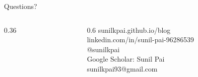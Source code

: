 \documentclass[aspectratio=169,10pt]{beamer}
\begin{document}
\begin{frame}[standout]
{\LARGE Questions?}\par\vspace{14pt}
\begin{columns}[c]
\begin{column}{0.36\textwidth}
\begin{center}
\end{center}
\end{column}
\begin{column}{0.6\textwidth}
{\normalsize
{}\; sunilkpai.github.io/blog\\[4pt]
\; linkedin.com/in/sunil-pai-96286539\\[4pt]
\; @sunilkpai\\[4pt]
\; Google Scholar: Sunil Pai\\[4pt]
\; sunilkpai93@gmail.com}
\end{column}
\end{columns}
\end{frame}
\end{document}
